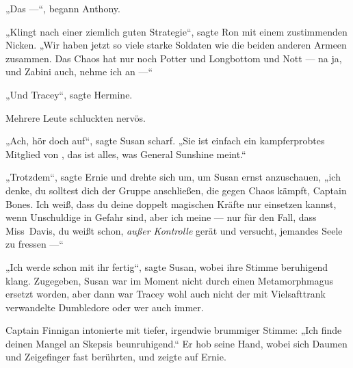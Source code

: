 „Das —“, begann Anthony.

„Klingt nach einer ziemlich guten Strategie“, sagte Ron mit einem zustimmenden Nicken.
„Wir haben jetzt so viele starke Soldaten wie die beiden anderen Armeen zusammen. Das Chaos hat nur noch Potter und Longbottom und Nott — na ja, und Zabini auch, nehme ich an —“

„Und Tracey“, sagte Hermine.

Mehrere Leute schluckten nervös.

„Ach, hör doch auf“, sagte Susan scharf.
„Sie ist einfach ein kampferprobtes Mitglied von \SPHEW, das ist alles, was General Sunshine meint.“

„Trotzdem“, sagte Ernie und drehte sich um, um Susan ernst anzuschauen, „ich denke, du solltest dich der Gruppe anschließen, die gegen Chaos kämpft, Captain Bones. Ich weiß, dass du deine doppelt magischen Kräfte nur einsetzen kannst, wenn Unschuldige in Gefahr sind, aber ich meine — nur für den Fall, dass Miss~Davis, du weißt schon, \emph{außer Kontrolle} gerät und versucht, jemandes Seele zu fressen —“

„Ich werde schon mit ihr fertig“, sagte Susan, wobei ihre Stimme beruhigend klang. Zugegeben, Susan war im Moment nicht durch einen Metamorphmagus ersetzt worden, aber dann war Tracey wohl auch nicht der mit Vielsafttrank verwandelte Dumbledore oder wer auch immer.

Captain Finnigan intonierte mit tiefer, irgendwie brummiger Stimme:
„Ich finde deinen Mangel an Skepsis beunruhigend.“ Er hob seine Hand, wobei sich Daumen und Zeigefinger fast berührten, und zeigte auf Ernie.

